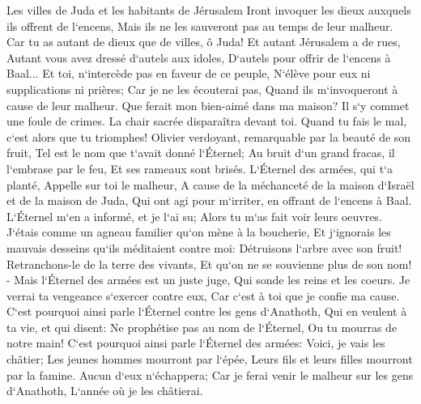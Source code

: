\verse Les villes de Juda et les habitants de Jérusalem Iront invoquer les dieux auxquels ils offrent de l`encens, Mais ils ne les sauveront pas au temps de leur malheur. 
\verse Car tu as autant de dieux que de villes, ô Juda! Et autant Jérusalem a de rues, Autant vous avez dressé d`autels aux idoles, D`autels pour offrir de l`encens à Baal... 
\verse Et toi, n`intercède pas en faveur de ce peuple, N`élève pour eux ni supplications ni prières; Car je ne les écouterai pas, Quand ils m`invoqueront à cause de leur malheur. 
\verse Que ferait mon bien-aimé dans ma maison? Il s`y commet une foule de crimes. La chair sacrée disparaîtra devant toi. Quand tu fais le mal, c`est alors que tu triomphes! 
\verse Olivier verdoyant, remarquable par la beauté de son fruit, Tel est le nom que t`avait donné l`Éternel; Au bruit d`un grand fracas, il l`embrase par le feu, Et ses rameaux sont brisés. 
\verse L`Éternel des armées, qui t`a planté, Appelle sur toi le malheur, A cause de la méchanceté de la maison d`Israël et de la maison de Juda, Qui ont agi pour m`irriter, en offrant de l`encens à Baal. 
\verse L`Éternel m`en a informé, et je l`ai su; Alors tu m`as fait voir leurs oeuvres. 
\verse J`étais comme un agneau familier qu`on mène à la boucherie, Et j`ignorais les mauvais desseins qu`ils méditaient contre moi: Détruisons l`arbre avec son fruit! Retranchons-le de la terre des vivants, Et qu`on ne se souvienne plus de son nom! - 
\verse Mais l`Éternel des armées est un juste juge, Qui sonde les reins et les coeurs. Je verrai ta vengeance s`exercer contre eux, Car c`est à toi que je confie ma cause. 
\verse C`est pourquoi ainsi parle l`Éternel contre les gens d`Anathoth, Qui en veulent à ta vie, et qui disent: Ne prophétise pas au nom de l`Éternel, Ou tu mourras de notre main! 
\verse C`est pourquoi ainsi parle l`Éternel des armées: Voici, je vais les châtier; Les jeunes hommes mourront par l`épée, Leurs fils et leurs filles mourront par la famine. 
\verse Aucun d`eux n`échappera; Car je ferai venir le malheur sur les gens d`Anathoth, L`année où je les châtierai. 

